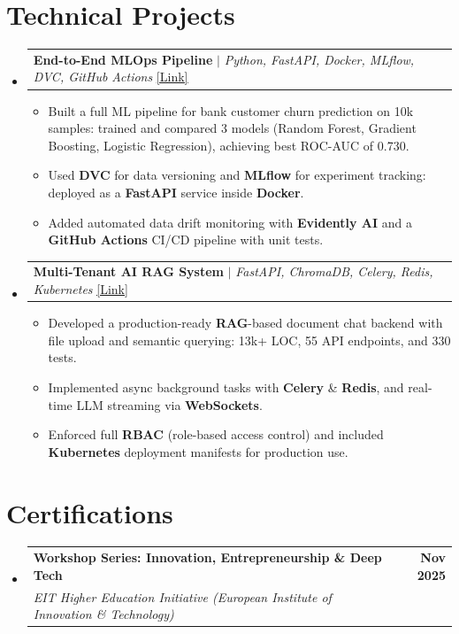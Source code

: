 \documentclass[letterpaper,11pt]{article}
\makeatletter
\newcommand{\resumeItem}[1]{
  \item\small{
    {#1 \vspace{-3pt}}
  }
}
\newcommand{\resumeSubheading}[4]{
  \vspace{-3pt}\item
    \begin{tabular*}{1.0\textwidth}[t]{l@{\extracolsep{\fill}}r}
      \textbf{#1} & \textbf{\small #2} \\
      \textit{\small#3} & \textit{\small #4} \\
    \end{tabular*}\vspace{-7pt}
}
\newcommand{\resumeProjectHeading}[2]{
  \vspace{-3pt}\item
    \begin{tabular*}{1.0\textwidth}[t]{l@{\extracolsep{\fill}}r}
      \small#1 & \textbf{\small #2} \\
    \end{tabular*}\vspace{-7pt}
}
\newcommand{\resumeSubHeadingListStart}{\begin{itemize}[leftmargin=0.0in, label={}]}
\newcommand{\resumeSubHeadingListEnd}{\end{itemize}}
\newcommand{\resumeItemListStart}{\begin{itemize}[leftmargin=0.15in]}
\newcommand{\resumeItemListEnd}{\end{itemize}\vspace{-5pt}}
\makeatother
\begin{document}
\section{Technical Projects}
  \resumeSubHeadingListStart
    \resumeProjectHeading
      {\textbf{End-to-End MLOps Pipeline} $|$ \emph{Python, FastAPI, Docker, MLflow, DVC, GitHub Actions} \href{https://github.com/georgebon5/MLOps-project}{\underline{[Link]}}}{}
    \resumeItemListStart
      \resumeItem{Built a full ML pipeline for bank customer churn prediction on 10k samples: trained and compared 3 models (Random Forest, Gradient Boosting, Logistic Regression), achieving best ROC-AUC of 0.730.}
      \resumeItem{Used \textbf{DVC} for data versioning and \textbf{MLflow} for experiment tracking: deployed as a \textbf{FastAPI} service inside \textbf{Docker}.}
      \resumeItem{Added automated data drift monitoring with \textbf{Evidently AI} and a \textbf{GitHub Actions} CI/CD pipeline with unit tests.}
    \resumeItemListEnd

    \vspace{6pt}
    \resumeProjectHeading
      {\textbf{Multi-Tenant AI RAG System} $|$ \emph{FastAPI, ChromaDB, Celery, Redis, Kubernetes} \href{https://github.com/georgebon5/multi-tenant-rag}{\underline{[Link]}}}{}
    \resumeItemListStart
      \resumeItem{Developed a production-ready \textbf{RAG}-based document chat backend with file upload and semantic querying: 13k+ LOC, 55 API endpoints, and 330 tests.}
      \resumeItem{Implemented async background tasks with \textbf{Celery} \& \textbf{Redis}, and real-time LLM streaming via \textbf{WebSockets}.}
      \resumeItem{Enforced full \textbf{RBAC} (role-based access control) and included \textbf{Kubernetes} deployment manifests for production use.}
    \resumeItemListEnd

  \resumeSubHeadingListEnd


\section{Certifications}
  \resumeSubHeadingListStart
    \resumeSubheading
      {Workshop Series: Innovation, Entrepreneurship \& Deep Tech}{Nov 2025}
      {EIT Higher Education Initiative (European Institute of Innovation \& Technology)}{}
  \resumeSubHeadingListEnd

\vspace{6pt}
\end{document}
